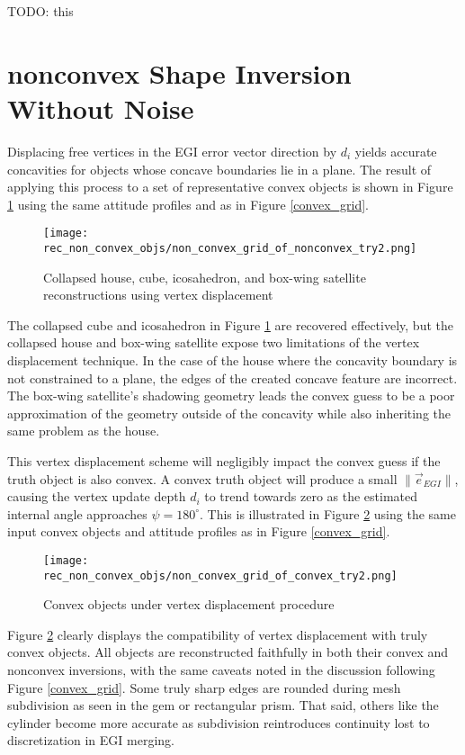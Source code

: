 TODO: this

\section{nonconvex Shape Inversion Without Noise}

Displacing free vertices in the EGI error vector direction by $d_i$ yields accurate concavities for objects whose concave boundaries lie in a plane. The result of applying this process to a set of representative convex objects is shown in Figure \ref{fig:non_convex_recon_of_non_convex} using the same attitude profiles and as in Figure \ref{convex_grid}. 

\begin{figure}[!htb]
  \centering
  \texttt{[image: rec\_non\_convex\_objs/non\_convex\_grid\_of\_nonconvex\_try2.png]}
  \caption{Collapsed house, cube, icosahedron, and box-wing satellite reconstructions using vertex displacement}
  \label{fig:non_convex_recon_of_non_convex}
\end{figure}

The collapsed cube and icosahedron in Figure \ref{fig:non_convex_recon_of_non_convex} are recovered effectively, but the collapsed house and box-wing satellite expose two limitations of the vertex displacement technique. In the case of the house where the concavity boundary is not constrained to a plane, the edges of the created concave feature are incorrect. The box-wing satellite's shadowing geometry leads the convex guess to be a poor approximation of the geometry outside of the concavity while also inheriting the same problem as the house.

This vertex displacement scheme will negligibly impact the convex guess if the truth object is also convex. A convex truth object will produce a small $\|\vec{e}_{EGI}\|$, causing the vertex update depth $d_{i}$ to trend towards zero as the estimated internal angle approaches $\psi = 180^\circ$. This is illustrated in Figure \ref{fig:non_convex_recon_of_convex} using the same input convex objects and attitude profiles as in Figure \ref{convex_grid}.

\begin{figure}[!htb]
  \centering
  \texttt{[image: rec\_non\_convex\_objs/non\_convex\_grid\_of\_convex\_try2.png]}
  \caption{Convex objects under vertex displacement procedure}
  \label{fig:non_convex_recon_of_convex}
\end{figure}

Figure \ref{fig:non_convex_recon_of_convex} clearly displays the compatibility of vertex displacement with truly convex objects. All objects are reconstructed faithfully in both their convex and nonconvex inversions, with the same caveats noted in the discussion following Figure \ref{convex_grid}. Some truly sharp edges are rounded during mesh subdivision as seen in the gem or rectangular prism. That said, others like the cylinder become more accurate as subdivision reintroduces continuity lost to discretization in EGI merging.

